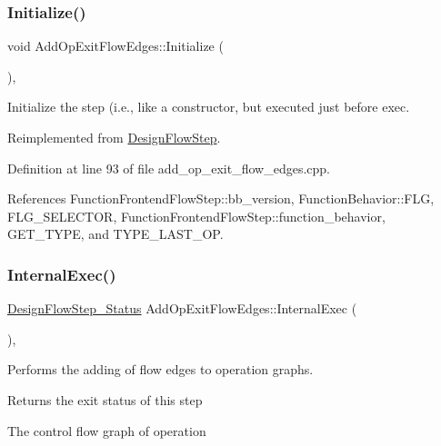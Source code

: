 \subsubsection{\texorpdfstring{Initialize()}{Initialize()}}
{\footnotesize\ttfamily void Add\+Op\+Exit\+Flow\+Edges\+::\+Initialize (\begin{DoxyParamCaption}{ }\end{DoxyParamCaption})\hspace{0.3cm}{\ttfamily [override]}, {\ttfamily [virtual]}}



Initialize the step (i.\+e., like a constructor, but executed just before exec. 



Reimplemented from \hyperlink{classDesignFlowStep_a44b50683382a094976e1d432a7784799}{Design\+Flow\+Step}.



Definition at line 93 of file add\+\_\+op\+\_\+exit\+\_\+flow\+\_\+edges.\+cpp.



References Function\+Frontend\+Flow\+Step\+::bb\+\_\+version, Function\+Behavior\+::\+F\+LG, F\+L\+G\+\_\+\+S\+E\+L\+E\+C\+T\+OR, Function\+Frontend\+Flow\+Step\+::function\+\_\+behavior, G\+E\+T\+\_\+\+T\+Y\+PE, and T\+Y\+P\+E\+\_\+\+L\+A\+S\+T\+\_\+\+OP.

\mbox{\label{classAddOpExitFlowEdges_a2fff48c7aee4af42bd8b509af08c40e5}} 
\subsubsection{\texorpdfstring{Internal\+Exec()}{InternalExec()}}
{\footnotesize\ttfamily \hyperlink{design__flow__step_8hpp_afb1f0d73069c26076b8d31dbc8ebecdf}{Design\+Flow\+Step\+\_\+\+Status} Add\+Op\+Exit\+Flow\+Edges\+::\+Internal\+Exec (\begin{DoxyParamCaption}{ }\end{DoxyParamCaption})\hspace{0.3cm}{\ttfamily [override]}, {\ttfamily [virtual]}}



Performs the adding of flow edges to operation graphs. 

\begin{DoxyReturn}{Returns}
the exit status of this step 
\end{DoxyReturn}
The control flow graph of operation

